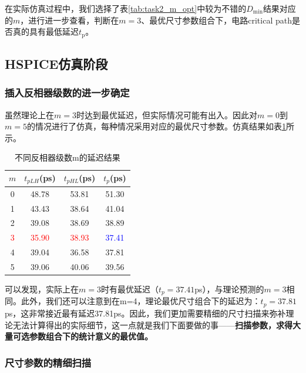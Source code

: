 \documentclass[UTF8,12pt,a4paper]{ctexart}
\begin{document}
在实际仿真过程中，我们选择了表\ref{tab:task2_m_opt}中较为不错的$D_{\text{min}}$结果对应的$m$，进行进一步查看，判断在$m=3$、最优尺寸参数组合下，电路critical path是否真的具有最低延迟$t_{\text{p}}$。

\subsection{HSPICE仿真阶段}

\subsubsection{插入反相器级数的进一步确定}

虽然理论上在$m = 3$时达到最优延迟，但实际情况可能有出入。因此对$m = 0$到$m = 5$的情况进行了仿真，每种情况采用对应的最优尺寸参数。仿真结果如表\ref{tab:task2_m}所示。

\begin{table}[htbp]
\centering
\caption{不同反相器级数m的延迟结果}
\label{tab:task2_m}
\begin{tabular}{cccc}
\toprule
$m$ & $t_{pLH}$(ps) & $t_{pHL}$(ps) & $t_p$(ps) \\
\midrule
0 & 48.78 & 53.81 & 51.30 \\
1 & 43.43 & 38.64 & 41.04 \\
2 & 39.08 & 38.69 & 38.89 \\
\textcolor{red}{3} & \textcolor{red}{35.90} & \textcolor{red}{38.93} & \textcolor{blue}{37.41} \\
4 & 39.04 & 36.58 & 37.81 \\
5 & 39.06 & 40.06 & 39.56 \\
\bottomrule
\end{tabular}
\end{table}

可以发现，实际上在$m = 3$时有最优延迟（$t_p = 37.41$ps），与理论预测的$m = 3$相同。此外，我们还可以注意到在m=4，理论最优尺寸组合下的延迟为：$t_p = 37.81$ps，这非常接近最有延迟37.81ps。因此，我们更加需要精细的尺寸扫描来弥补理论无法计算得出的实际细节，这一点就是我们下面要做的事——\textbf{扫描参数，求得大量可选参数组合下的统计意义的最优值。}


\subsubsection{尺寸参数的精细扫描}
\end{document}
